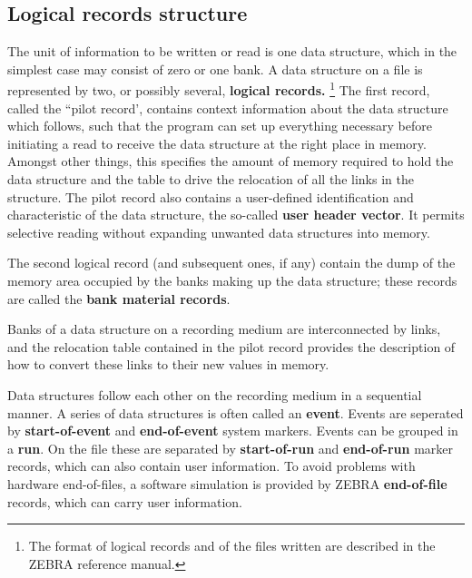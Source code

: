 \subsection{Logical records structure}
\par The unit of information to be written or read is one data structure,
which in the simplest case may consist of zero or one bank.
A data structure on a file is represented by two,
or possibly several,
{\bf logical records.}
\footnote{
The format of logical records and of the files written
are described in the ZEBRA reference manual.
}
The first record, called the ``pilot record',
contains context information about the data structure which follows,
such that the program can set up everything necessary before
initiating a read to receive the data structure
at the right place in memory.
Amongst other things,
this specifies the amount of memory required to hold
the data structure and the table to drive the relocation
of all the links in the structure.
The pilot record also contains a user-defined identification
and characteristic of the data structure, the so-called
{\bf user header vector}.
It permits selective reading without expanding unwanted
data structures into memory.
\par The second logical record (and subsequent ones, if any)
contain the dump of the memory area occupied by the banks
making up the data structure;
these records are called the {\bf bank material records}.
\par Banks of a data structure on a recording medium
are interconnected by links,
and the relocation table contained in the pilot record provides
the description of how to convert these links to their new values
in memory.
\par Data structures follow each other on the recording medium
in a sequential manner.
\newline
A series of data structures is often called an {\bf event}.
Events are seperated by {\bf start-of-event} and
{\bf end-of-event} system markers.
\newline
Events can be grouped in a {\bf run}. On the file these are
separated by {\bf start-of-run} and {\bf end-of-run}
marker records, which can also contain user information.
\newline
To avoid problems with hardware end-of-files,
a software simulation is provided by ZEBRA {\bf end-of-file}
records, which can carry user information.
